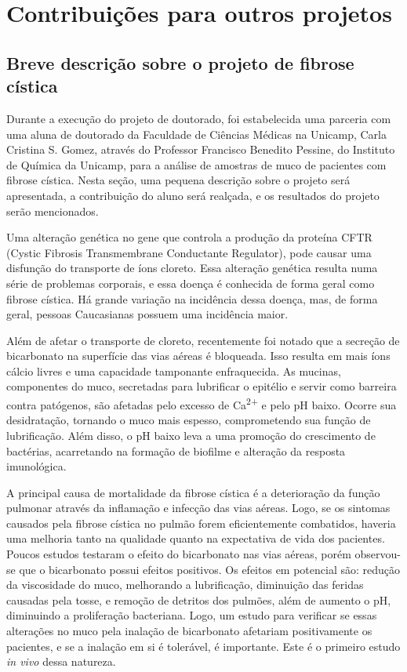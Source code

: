 \part{Contribuições para outros projetos}

	\chapter{Breve descrição sobre o projeto de fibrose cística} 

	Durante a execução do projeto de doutorado, foi estabelecida uma parceria com uma aluna de doutorado da Faculdade de Ciências Médicas na Unicamp, Carla Cristina S. Gomez, através do Professor Francisco Benedito Pessine, do Instituto de Química da Unicamp, para a análise de amostras de muco de pacientes com fibrose cística. Nesta seção, uma pequena descrição sobre o projeto será apresentada, a contribuição do aluno será realçada, e os resultados do projeto serão mencionados.
	
	Uma alteração genética no gene que controla a produção da proteína CFTR (Cystic Fibrosis Transmembrane Conductante Regulator)\cite{Zielenski2000}, pode causar uma disfunção do transporte de íons cloreto.\cite{Quinton2008} Essa alteração genética resulta numa série de problemas corporais, e essa doença é conhecida de forma geral como fibrose cística. Há grande variação na incidência dessa doença, mas, de forma geral, pessoas Caucasianas possuem uma incidência maior.\cite{Zielenski2000}
	
	Além de afetar o transporte de cloreto, recentemente foi notado que a secreção de bicarbonato na superfície das vias aéreas é bloqueada.\cite{Quinton2001}  Isso resulta em mais íons cálcio livres e uma capacidade tamponante enfraquecida. As mucinas, componentes do muco, secretadas para lubrificar o epitélio e servir como barreira contra patógenos, são afetadas pelo excesso de Ca\textsuperscript{2+} e pelo pH baixo. Ocorre sua desidratação, tornando o muco mais espesso, comprometendo sua função de lubrificação.\cite{Quinton2008} Além disso, o pH baixo leva a uma promoção do crescimento de bactérias, acarretando na formação de biofilme e alteração da resposta imunológica.\cite{Dorschner2006}
	
	A principal causa de mortalidade da fibrose cística é a deterioração da função pulmonar através da inflamação e infecção das vias aéreas.\cite{Quinton2001} Logo, se os sintomas causados pela fibrose cística no pulmão forem eficientemente combatidos, haveria uma melhoria tanto na qualidade quanto na expectativa de vida dos pacientes. Poucos estudos testaram o efeito do bicarbonato nas vias aéreas, porém observou-se que o bicarbonato possui efeitos positivos.\cite{Stigliani2016} Os efeitos em potencial são: redução da viscosidade do muco, melhorando a lubrificação, diminuição das feridas causadas pela tosse, e remoção de detritos dos pulmões, além de aumento o pH, diminuindo a proliferação bacteriana. Logo, um estudo para verificar se essas alterações no muco pela inalação de bicarbonato afetariam positivamente os pacientes, e se a inalação em si é tolerável, é importante. Este é o primeiro estudo \emph{in vivo} dessa natureza.
	
